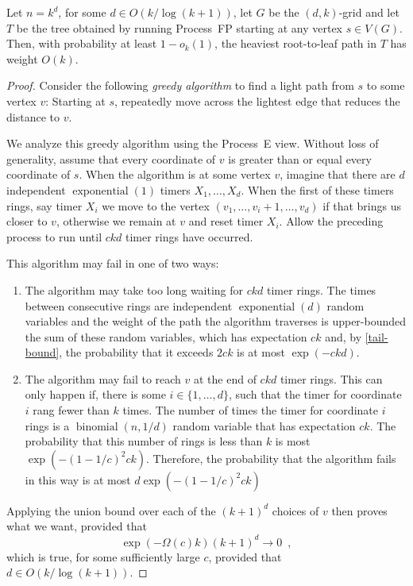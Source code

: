 \documentclass[lotsofwhite]{patmorin}
\DeclareMathOperator{\exponential}{exponential}
\DeclareMathOperator{\binomial}{binomial}
\begin{document}
\begin{thm}
   Let $n=k^d$, for some $d\in O(k/\log(k+1))$, let $G$ be the $(d,k)$-grid
   and let $T$ be the tree obtained by running Process~FP starting at
   any vertex $s\in V(G)$.  Then, with probability at least $1-o_k(1)$,
   the heaviest root-to-leaf path in $T$ has weight $O(k)$.
\end{thm}

\begin{proof}
   Consider the following \emph{greedy algorithm} to find a light path
   from $s$ to some vertex $v$:  Starting at $s$, repeatedly
   move across the lightest edge that reduces the distance to $v$.

   We analyze this greedy algorithm using the Process~E view. Without
   loss of generality, assume that every coordinate of $v$ is greater
   than or equal every coordinate of $s$.  When the algorithm is at some
   vertex $v$, imagine that there are $d$ independent $\exponential(1)$
   timers $X_1,\ldots,X_d$. When the first of these timers rings, say
   timer $X_i$ we move to the vertex $(v_1,\ldots,v_{i}+1,\ldots,v_d)$
   if that brings us closer to $v$, otherwise we remain at $v$ and reset
   timer $X_i$.  
   Allow the preceding process to run until $ckd$ timer rings have
   occurred.  

   This algorithm may fail in one of two ways:
   \begin{enumerate}
      \item The algorithm may take too long waiting for $ckd$ timer
       rings.  The times between consecutive rings are independent
       $\exponential(d)$ random variables and the weight of the path
       the algorithm traverses is upper-bounded the sum of these random
       variables, which has expectation $ck$ and, by \eqref{tail-bound},
       the probability that it exceeds $2ck$ is at most $\exp(-ckd)$.

      \item The algorithm may fail to reach $v$ at the end of $ckd$ timer
      rings.  This can only happen if, there is some $i\in\{1,\ldots,d\}$,
      such that the timer for coordinate $i$ rang fewer than $k$ times.
      The number of times the timer for coordinate $i$ rings is a
      $\binomial(n,1/d)$ random variable that has expectation $ck$.
      The probability that this number of rings is less than $k$ is
      most $\exp(-(1-1/c)^2ck)$.  Therefore, the probability that the 
      algorithm fails in this way is at most $d\exp(-(1-1/c)^2ck)$
   \end{enumerate} 

   Applying the union bound over each of the $(k+1)^{d}$ choices of $v$
   then proves what we want, provided that
   \[
         \exp(-\Omega(c)k) (k+1)^d \to 0 \enspace ,
   \]
   which is true, for some sufficiently large $c$, provided that $d\in O(k/\log (k+1))$.
\end{proof}
\end{document}
